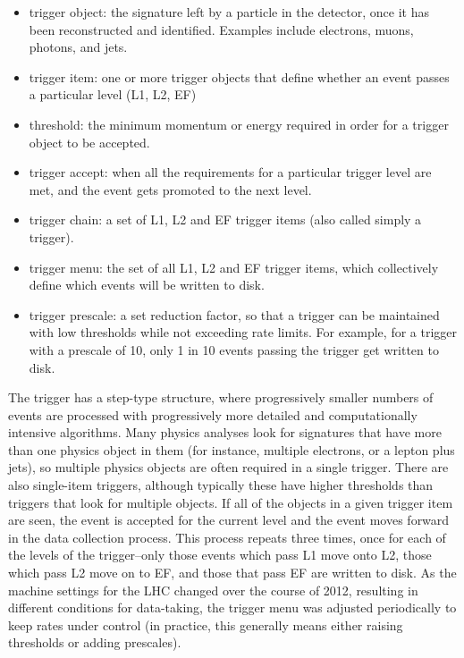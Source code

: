 \begin{itemize}
	\item trigger object: the signature left by a particle in the detector, once it has been reconstructed and identified.  Examples include electrons, muons, photons, and jets.
	\item trigger item: one or more trigger objects that define whether an event passes a particular level (L1, L2, EF)
	\item threshold: the minimum momentum or energy required in order for a trigger object to be accepted.
	\item trigger accept: when all the requirements for a particular trigger level are met, and the event gets promoted to the next level.

	\item trigger chain: a set of L1, L2 and EF trigger items (also called simply a trigger).
	\item trigger menu: the set of all L1, L2 and EF trigger items, which collectively define which events will be written to disk.
	\item trigger prescale: a set reduction factor, so that a trigger can be maintained with low thresholds while not exceeding rate limits.  For example, for a trigger with a prescale of 10, only 1 in 10 events passing the trigger get written to disk.
\end{itemize}
 

The trigger has a step-type structure, where progressively smaller numbers of events are processed with progressively more detailed and computationally intensive algorithms.  Many physics analyses look for signatures that have more than one physics object in them (for instance, multiple electrons, or a lepton plus jets), so multiple physics objects are often required in a single trigger.  There are also single-item triggers, although typically these have higher thresholds than triggers that look for multiple objects.  If all of the objects in a given trigger item are seen, the event is accepted for the current level and the event moves forward in the data collection process.  This process repeats three times, once for each of the levels of the trigger--only those events which pass L1 move onto L2, those which pass L2 move on to EF, and those that pass EF are written to disk.   As the machine settings for the LHC changed over the course of 2012, resulting in different conditions for data-taking, the trigger menu was adjusted periodically to keep rates under control (in practice, this generally means either raising thresholds or adding prescales).  


